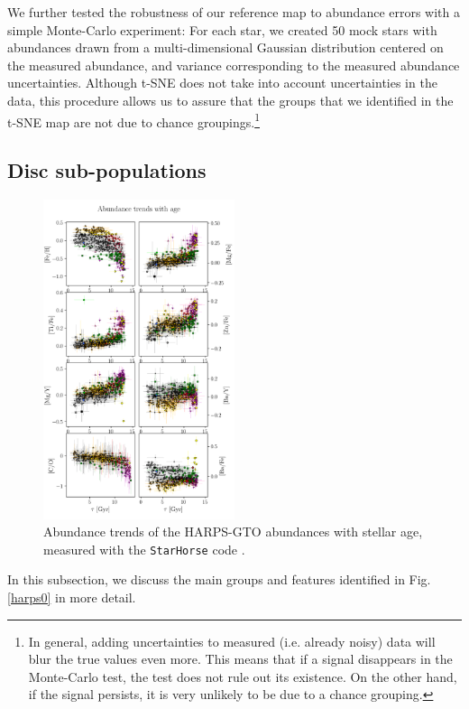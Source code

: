 \documentclass{aa}  %
\begin{document}
We further tested the robustness of our reference map to abundance errors with a simple Monte-Carlo experiment: For each star, we created 50 mock stars with abundances drawn from a multi-dimensional Gaussian distribution centered on the measured abundance, and variance corresponding to the measured abundance uncertainties. Although t-SNE does not take into account uncertainties in the data, this procedure allows us to assure that the groups that we identified in the t-SNE map are not due to chance groupings.\footnote{In general, adding uncertainties to measured (i.e. already noisy) data will blur the true values even more. This means that if a signal disappears in the Monte-Carlo test, the test does not rule out its existence. On the other hand, if the signal persists, it is very unlikely to be due to a chance grouping.} 

\subsection{Disc sub-populations}

\begin{figure}\centering
 \includegraphics[width=0.5\textwidth]{im/harps_tsne-age-abundsplot_teffcut.png}
\caption{Abundance trends of the HARPS-GTO abundances with stellar age, measured with the \texttt{StarHorse} code \citep{Queiroz2018}.}
\label{age}
\end{figure}

In this subsection, we discuss the main groups and features identified in Fig. \ref{harps0} in more detail.\\
\end{document}
